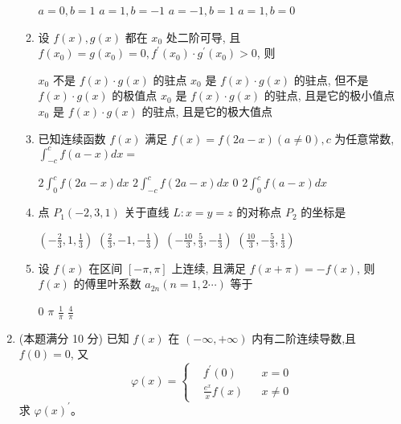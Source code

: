 \begin{enumerate}
\begin{enumerate}
	
\fourchoices
{$a=0, b=1$}
{$a=1, b=-1$}
{$a=-1, b=1$}
{$a=1, b=0$}

	
	
	\item
	设 $f(x), g(x)$ 都在 $x_{0}$ 处二阶可导, 且 $f\left(x_{0}\right)=g\left(x_{0}\right)=0, f^{\prime}\left(x_{0}\right) \cdot g^{\prime}\left(x_{0}\right)>0$, 则  
	
	
\fourchoices
{$x_{0}$ 不是 $f(x) \cdot g(x)$ 的驻点}
{$x_{0}$ 是 $f(x) \cdot g(x)$ 的驻点, 但不是 $f(x) \cdot g(x)$ 的极值点}
{$x_{0}$ 是 $f(x) \cdot g(x)$ 的驻点, 且是它的极小值点}
{$x_{0}$ 是 $f(x) \cdot g(x)$ 的驻点, 且是它的极大值点}

	
\item 
已知连续函数 $f(x)$ 满足 $f(x)=f(2 a-x)(a \neq 0), c$ 为任意常数, $\int_{-c}^{c} f(a-x) d x=$


\fourchoices
{$2 \int_{0}^{c} f(2 a-x) d x$}
{$2 \int_{-c}^{c} f(2 a-x) d x$}
{$ 0 $}
{$2 \int_{0}^{c} f(a-x) d x$}
	

\item 
点 $P_{1}(-2,3,1)$ 关于直线 $L: x=y=z$ 的对称点 $P_{2}$ 的坐标是  


\fourchoices
{$\left(-\frac{2}{3}, 1, \frac{1}{3}\right)$}
{$\left(\frac{2}{3},-1,-\frac{1}{3}\right)$}
{$\left(-\frac{10}{3}, \frac{5}{3},-\frac{1}{3}\right)$}
{$\left(\frac{10}{3},-\frac{5}{3}, \frac{1}{3}\right)$}



\item
设 $f(x)$ 在区间 $[-\pi, \pi]$ 上连续, 且满足 $f(x+\pi)=-f(x)$, 则 $f(x)$ 的傅里叶系数 $a_{2 n}(n=1,2 \cdots)$ 等于  


\fourchoices
{$ 0 $}
{$\pi$}
{$\frac{1}{\pi}$}
{$\frac{4}{\pi}$}


	
\end{enumerate}



\item 
(本题满分 10 分)
已知 $f(x)$ 在 $(-\infty,+\infty)$ 内有二阶连续导数,且 $f(0)=0$, 又 
\[ 
\varphi(x)=\left\{\begin{aligned}&f^{\prime}(0) && x=0 \\ 
	&\frac{e^{x}}{x} f(x) && x \neq 0\end{aligned}\right.
 \]
 求 $\varphi(x) ^{\prime} $。


\end{enumerate}
